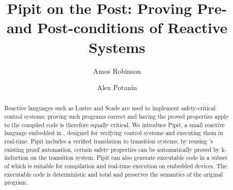 \documentclass[a4paper,UKenglish,cleveref, autoref, thm-restate,anonymous]{lipics-v2021}
\title{Pipit on the Post: Proving Pre- and Post-conditions of Reactive Systems}
\author{Amos Robinson}{Australian National University, Canberra, Australia}{amos.robinson@anu.edu.au}{https://orcid.org/0009-0004-4837-4981}{}
\author{Alex Potanin}{Australian National University, Canberra, Australia}{alex.potanin@anu.edu.au}{https://orcid.org/0000-0002-4242-2725}{}
\begin{document}
\maketitle

\begin{abstract}
  Reactive languages such as Lustre and Scade are used to implement safety-critical control systems; proving such programs correct and having the proved properties apply to the compiled code is therefore equally critical.
  We introduce Pipit, a small reactive language embedded in \fstar{}, designed for verifying control systems and executing them in real-time.
  Pipit includes a verified translation to transition systems; by reusing \fstar{}'s existing proof automation, certain safety properties can be automatically proved by k-induction on the transition system.
  Pipit can also generate executable code in a subset of \fstar{} which is suitable for compilation and real-time execution on embedded devices.
  The executable code is deterministic and total and preserves the semantics of the original program.
\end{abstract}


\makeatactive
















\end{document}

